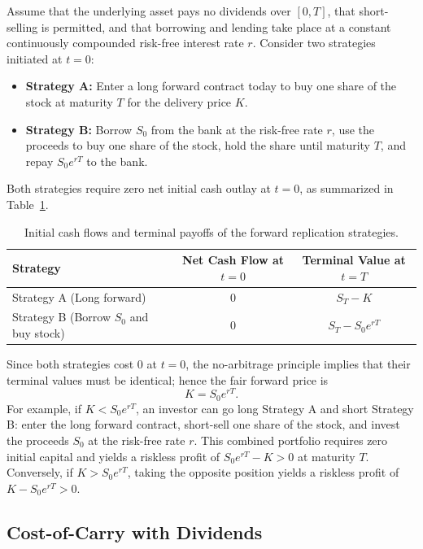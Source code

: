 Assume that the underlying asset pays no dividends over $[0, T]$, that short-selling is permitted, and that borrowing and lending take place at a constant continuously compounded risk-free interest rate $r$. Consider two strategies initiated at $t = 0$:
\begin{itemize}
    \item \textbf{Strategy A:} Enter a long forward contract today to buy one share of the stock at maturity $T$ for the delivery price $K$.
    \item \textbf{Strategy B:} Borrow $S_0$ from the bank at the risk-free rate $r$, use the proceeds to buy one share of the stock, hold the share until maturity $T$, and repay $S_0 e^{rT}$ to the bank.
\end{itemize}
Both strategies require zero net initial cash outlay at $t = 0$, as summarized in Table~\ref{tab:forward_replication}.

\begin{table}[!ht]
    \centering
    \caption{Initial cash flows and terminal payoffs of the forward replication strategies.}
    \label{tab:forward_replication}
    \begin{tabular}{lcc}
        \toprule
        Strategy & Net Cash Flow at $t = 0$ & Terminal Value at $t = T$ \\
        \midrule
        Strategy A (Long forward) & $0$ & $S_T - K$ \\
        Strategy B (Borrow $S_0$ and buy stock) & $0$ & $S_T - S_0 e^{rT}$ \\
        \bottomrule
    \end{tabular}
\end{table}

Since both strategies cost $0$ at $t = 0$, the no-arbitrage principle implies that their terminal values must be identical; hence the fair forward price is
\begin{equation}
\label{eq:forward_price}
    K = S_0 e^{rT}.
\end{equation}
For example, if $K < S_0 e^{rT}$, an investor can go long Strategy A and short Strategy B: enter the long forward contract, short-sell one share of the stock, and invest the proceeds $S_0$ at the risk-free rate $r$. This combined portfolio requires zero initial capital and yields a riskless profit of $S_0 e^{rT} - K > 0$ at maturity $T$. Conversely, if $K > S_0 e^{rT}$, taking the opposite position yields a riskless profit of $K - S_0 e^{rT} > 0$.

\subsection{Cost-of-Carry with Dividends}

